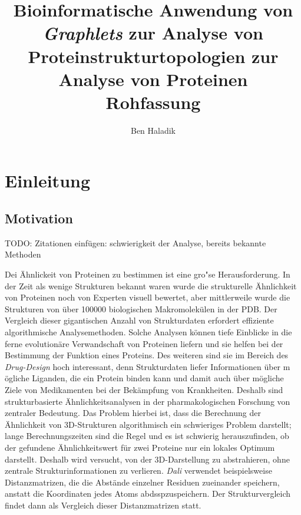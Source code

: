 \documentclass{report}
\author{Ben Haladik}
\title{Bioinformatische Anwendung von \textit{Graphlets} zur Analyse von Proteinstrukturtopologien zur Analyse von Proteinen \\ Rohfassung}
\begin{document}
\maketitle

\newpage

\tableofcontents

\newpage

\chapter{Einleitung}

\section{Motivation}

TODO: Zitationen einf\"ugen: schwierigkeit der Analyse, bereits bekannte Methoden

Dei \"Ahnlickeit von Proteinen zu bestimmen ist eine gro"se Herausforderung. In der Zeit als wenige Strukturen bekannt waren wurde die strukturelle \"Ahnlichkeit von Proteinen noch von Experten visuell bewertet, aber mittlerweile wurde die Strukturen von \"uber 100000 biologischen Makromolek\"ulen in der PDB. Der Vergleich dieser gigantischen Anzahl von Strukturdaten erfordert effiziente algorithmische Analysemethoden. Solche Analysen k\"onnen tiefe Einblicke in die ferne evolution\"are Verwandschaft von Proteinen liefern und sie helfen bei der Bestimmung der Funktion eines Proteins. Des weiteren sind sie im Bereich des \textit{Drug-Design} hoch interessant, denn  Strukturdaten liefer Informationen \"uber m \"ogliche Liganden, die ein Protein binden kann und damit auch \"uber m\"ogliche Ziele von Medikamenten bei der Bek\"ampfung von Krankheiten. Deshalb sind strukturbasierte \"Ahnlichkeitsanalysen in der pharmakologischen Forschung von zentraler Bedeutung.
Das Problem hierbei ist, dass die Berechnung der \"Ahnlichkeit von 3D-Strukturen algorithmisch ein schwieriges Problem darstellt; lange Berechnungszeiten sind die Regel und es ist schwierig herauszufinden, ob der gefundene \"Ahnlichkeitswert f\"ur zwei Proteine nur ein lokales Optimum darstellt.
Deshalb wird versucht, von der 3D-Darstellung zu abstrahieren, ohne zentrale Strukturinformationen zu verlieren. \emph{Dali} \cite{dali}verwendet beispielsweise Distanzmatrizen, die die Abst\"ande einzelner Residuen zueinander speichern, anstatt die Koordinaten jedes Atoms abdsspzuspeichern.
Der Strukturvergleich findet dann als Vergleich dieser Distanzmatrizen statt.
\end{document}
